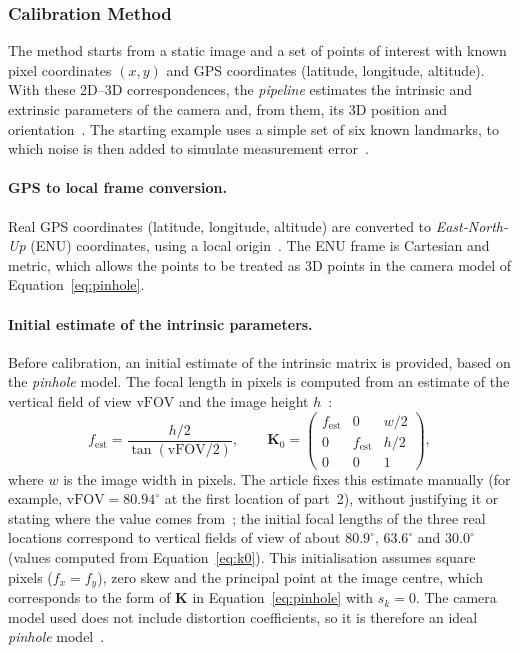 \subsubsection{Calibration Method}
\label{sec:sunkara_metodo}

The method starts from a static image and a set of points of interest with known pixel coordinates $(x, y)$ and GPS coordinates (latitude, longitude, altitude). With these 2D--3D correspondences, the \textit{pipeline} estimates the intrinsic and extrinsic parameters of the camera and, from them, its 3D position and orientation~\cite{sunkara2025}. The starting example uses a simple set of six known landmarks, to which noise is then added to simulate measurement error~\cite{sunkara2025}.

\paragraph{GPS to local frame conversion.} Real GPS coordinates (latitude, longitude, altitude) are converted to \textit{East-North-Up} (ENU) coordinates, using a local origin~\cite{sunkara2025}. The ENU frame is Cartesian and metric, which allows the points to be treated as 3D points in the camera model of Equation~\eqref{eq:pinhole}.

\paragraph{Initial estimate of the intrinsic parameters.} Before calibration, an initial estimate of the intrinsic matrix is provided, based on the \textit{pinhole} model. The focal length in pixels is computed from an estimate of the vertical field of view $\mathrm{vFOV}$ and the image height $h$~\cite{sunkara2025}:
\begin{equation}
    f_{\mathrm{est}}=\frac{h/2}{\tan\!\left(\mathrm{vFOV}/2\right)},
    \qquad
    \mathbf{K}_0=
    \begin{pmatrix}
        f_{\mathrm{est}} & 0 & w/2\\
        0 & f_{\mathrm{est}} & h/2\\
        0 & 0 & 1
    \end{pmatrix},
    \label{eq:k0}
\end{equation}
where $w$ is the image width in pixels. The article fixes this estimate manually (for example, $\mathrm{vFOV}=80.94^{\circ}$ at the first location of part~2), without justifying it or stating where the value comes from~\cite{sunkara2025}; the initial focal lengths of the three real locations correspond to vertical fields of view of about $80.9^{\circ}$, $63.6^{\circ}$ and $30.0^{\circ}$ (values computed from Equation~\eqref{eq:k0}). This initialisation assumes square pixels ($f_x=f_y$), zero skew and the principal point at the image centre, which corresponds to the form of $\mathbf{K}$ in Equation~\eqref{eq:pinhole} with $s_k=0$. The camera model used does not include distortion coefficients, so it is therefore an ideal \textit{pinhole} model~\cite{sunkara2025}.

